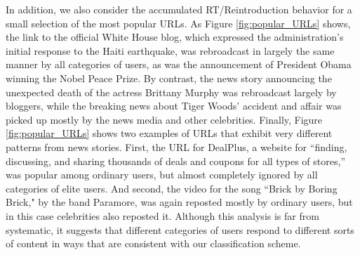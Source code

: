 \documentclass[phd,tocprelim]{cornell}
\begin{document}
In addition, we also consider the accumulated RT/Reintroduction behavior for a
small selection of the most popular URLs. As Figure \ref{fig:popular_URLs}
shows, the link to the official White House blog, which expressed the
administration's initial response to the Haiti earthquake, was rebroadcast
in largely the same manner by all categories of users, as was the
announcement of President Obama winning the Nobel Peace Prize.  By
contrast, the news story announcing the unexpected death of the actress
Brittany Murphy was rebroadcast largely by bloggers, while the breaking
news about Tiger Woods' accident and affair was picked up mostly by the
news media and other celebrities.  Finally, Figure \ref{fig:popular_URLs}
shows two examples of URLs that exhibit very different patterns from news
stories.  First, the URL for DealPlus, a website for ``finding, discussing,
and sharing thousands of deals and coupons for all types of stores,'' was
popular among ordinary users, but almost completely ignored by all
categories of elite users. And second, the video for the song ``Brick by
Boring Brick," by the band Paramore, was again reposted mostly by ordinary
users, but in this case celebrities also reposted it.  Although this
analysis is far from systematic, it suggests that different categories of
users respond to different sorts of content in ways that are consistent
with our classification scheme.
\end{document}
